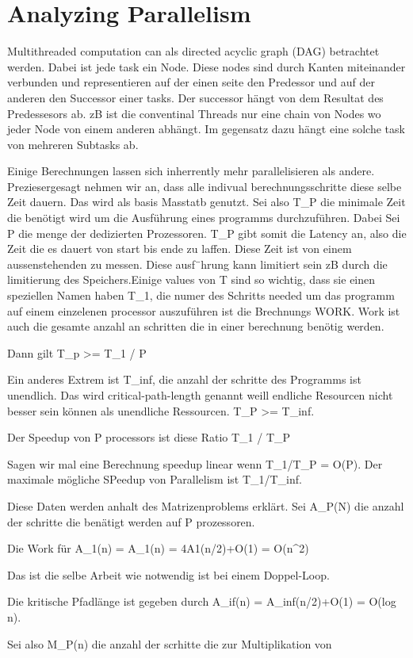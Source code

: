\section{Analyzing Parallelism}

Multithreaded computation can als directed acyclic graph (DAG) betrachtet werden. Dabei ist jede task ein Node. Diese nodes sind durch Kanten miteinander verbunden und representieren auf der einen seite den Predessor und auf der anderen den Successor einer tasks. Der successor hängt von dem Resultat des Predessesors ab. zB ist die conventinal Threads nur eine chain von Nodes wo jeder Node von einem anderen abhängt. Im gegensatz dazu hängt eine solche task von mehreren Subtasks ab.

Einige Berechnungen lassen sich inherrently mehr parallelisieren als andere. Preziesergesagt nehmen wir an, dass alle indivual berechnungsschritte diese selbe Zeit dauern. Das wird als basis Masstatb genutzt. Sei also T_P die minimale Zeit die benötigt wird um die Ausführung eines programms durchzuführen. Dabei Sei P die menge der dedizierten Prozessoren. T_P gibt somit die Latency an, also die Zeit die es dauert von start bis ende zu laffen. Diese Zeit ist von einem aussenstehenden zu messen. Diese ausf¨hrung kann limitiert sein zB durch die limitierung des Speichers.Einige values von T sind so wichtig, dass sie einen speziellen Namen haben T_1, die numer des Schritts needed um das programm auf einem einzelenen processor auszuführen ist die Brechnungs WORK. Work ist auch die gesamte anzahl an schritten die in einer berechnung benötig werden. 

Dann gilt T_p >= T_1 / P

Ein anderes Extrem ist T_inf, die anzahl der schritte des Programms ist unendlich. Das wird critical-path-length genannt weill endliche Resourcen nicht besser sein können als unendliche Ressourcen. T_P >= T_inf.


Der Speedup von P processors ist diese Ratio T_1 / T_P


Sagen wir mal eine Berechnung speedup linear wenn T_1/T_P = O(P). Der maximale mögliche SPeedup von Parallelism ist T_1/T_inf. 

Diese Daten werden anhalt des Matrizenproblems erklärt. Sei A_P(N) die anzahl der schritte die benätigt werden auf P prozessoren. 


Die Work für A_1(n) = A_1(n) = 4A1(n/2)+O(1) = O(n^2)

Das ist die selbe Arbeit wie notwendig ist bei einem Doppel-Loop.


Die kritische Pfadlänge ist gegeben durch A_if(n) = A_inf(n/2)+O(1) = O(log n).


Sei also M_P(n) die anzahl der scrhitte die zur Multiplikation von